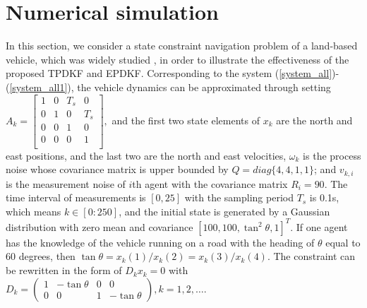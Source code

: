 \documentclass[journal,transmag]{IEEEtran}
\begin{document}
{	\section{Numerical simulation}
	In this section, we consider a state constraint navigation problem of a land-based vehicle, which was widely studied \cite{simon2010kalman,simon2002kalman}, in order to illustrate the effectiveness of the proposed TPDKF and EPDKF. 
	Corresponding to the system (\ref{system_all})-(\ref{system_all1}), 
	the  vehicle dynamics can be approximated through setting 
	$A_{k}=\left[\begin{smallmatrix}
	1 & 0 & T_s& 0\\  %
	0 &1 & 0 & T_s\\  %
	0 & 0 & 1& 0\\  %
	0 &0 & 0 & 1\\  %
	\end{smallmatrix}	\right],$
	and the first two state elements of $x_{k}$ are the north and east positions, and the last two are the north and east velocities,
	$\omega_k$ is the process noise whose covariance matrix is upper bounded by $Q=diag\{4,4,1,1\}$; and $v_{k,i}$ is the measurement noise of $i$th agent with the covariance matrix $R_i=90$.
	The time interval of measurements is $[0,25]$ with the sampling period $T_s$ is 0.1s, which means $k\in[0:250]$, and
	the initial state is generated by a Gaussian distribution with zero mean and covariance  $[100,100,\tan^2\theta,1]^T$. 
	If one agent has the knowledge of the vehicle running on a road with the heading of $\theta$ equal to $60$ degrees, then
	$\tan\theta=x_{k}(1)/x_{k}(2)=x_{k}(3)/x_{k}(4)$. The constraint can be rewritten in the form of $D_kx_{k}=0$ with $	D_k=\left(
	\begin{smallmatrix}
	1 & -\tan\theta& 0 & 0\\
	0  &  0       &  1&-\tan\theta
	\end{smallmatrix}
	\right),k=1,2,\ldots.$
}
\end{document}
